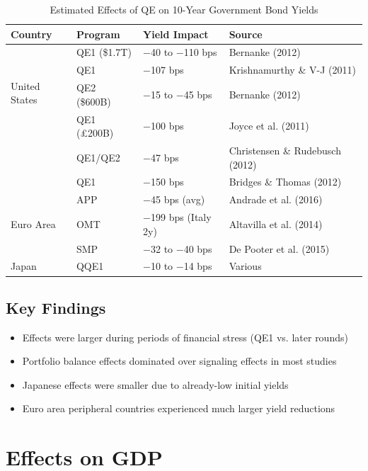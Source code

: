 \documentclass[11pt,a4paper]{article}
\begin{document}
\begin{table}[H]
\centering
\caption{Estimated Effects of QE on 10-Year Government Bond Yields}
\label{tab:yields}
\begin{tabular}{llll}
\toprule
\textbf{Country} & \textbf{Program} & \textbf{Yield Impact} & \textbf{Source} \\
\midrule
\multirow{4}{*}{United States}
    & QE1 (\$1.7T) & $-$40 to $-$110 bps & Bernanke (2012) \\
    & QE1 & $-$107 bps & Krishnamurthy \& V-J (2011) \\
    & QE2 (\$600B) & $-$15 to $-$45 bps & Bernanke (2012) \\
\midrule
\multirow{3}{*}{United Kingdom}
    & QE1 (\pounds200B) & $-$100 bps & Joyce et al. (2011) \\
    & QE1/QE2 & $-$47 bps & Christensen \& Rudebusch (2012) \\
    & QE1 & $-$150 bps & Bridges \& Thomas (2012) \\
\midrule
\multirow{3}{*}{Euro Area}
    & APP & $-$45 bps (avg) & Andrade et al. (2016) \\
    & OMT & $-$199 bps (Italy 2y) & Altavilla et al. (2014) \\
    & SMP & $-$32 to $-$40 bps & De Pooter et al. (2015) \\
\midrule
\multirow{2}{*}{Japan}
    & QQE1 & $-$10 to $-$14 bps & Various \\
\bottomrule
\end{tabular}
\end{table}

\subsection{Key Findings}

\begin{itemize}
    \item Effects were larger during periods of financial stress (QE1 vs. later rounds)
    \item Portfolio balance effects dominated over signaling effects in most studies
    \item Japanese effects were smaller due to already-low initial yields
    \item Euro area peripheral countries experienced much larger yield reductions
\end{itemize}

\section{Effects on GDP}
\end{document}
